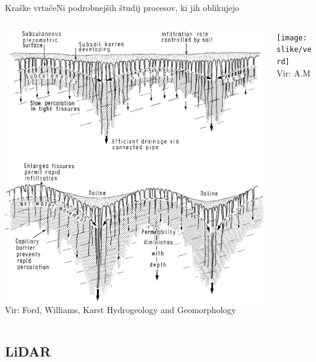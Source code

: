 \documentclass{beamer}
\begin{document}
\begin{frame}{Kraške vrtače}{Ni podrobnejših študij procesov, ki jih oblikujejo}

\begin{columns}
  \begin{column}{0.6\textwidth}
    \includegraphics[width=\textwidth]{slike/vrtaca-ford-williams}
    \tiny{\\Vir: Ford, Williams, Karst Hydrogeology and Geomorphology}
  \end{column}

  \begin{column}{0.5\textwidth}
    \texttt{[image: slike/verd]}
    \tiny{\\Vir: A.M}
  \end{column}
\end{columns}
\end{frame}


\subsection{LiDAR}

\end{document}
